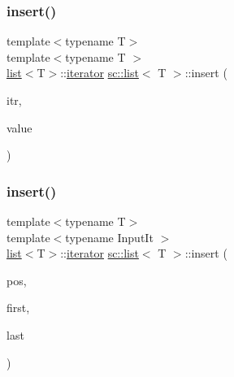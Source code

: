 \subsubsection{\texorpdfstring{insert()}{insert()}\hspace{0.1cm}{\footnotesize\ttfamily [4/7]}}
{\footnotesize\ttfamily template$<$typename T$>$ \\
template$<$typename T $>$ \\
\mbox{\hyperlink{classsc_1_1list}{list}}$<$T$>$\+::\mbox{\hyperlink{classsc_1_1list_1_1iterator}{iterator}} \mbox{\hyperlink{classsc_1_1list}{sc\+::list}}$<$ T $>$\+::insert (\begin{DoxyParamCaption}\item[{\mbox{\hyperlink{classsc_1_1list_1_1iterator}{iterator}}}]{itr,  }\item[{const T \&}]{value }\end{DoxyParamCaption})}

\mbox{\label{classsc_1_1list_ad26f50a102e4f66e4d0771bd602fa5f8}} 
\subsubsection{\texorpdfstring{insert()}{insert()}\hspace{0.1cm}{\footnotesize\ttfamily [5/7]}}
{\footnotesize\ttfamily template$<$typename T$>$ \\
template$<$typename Input\+It $>$ \\
\mbox{\hyperlink{classsc_1_1list}{list}}$<$T$>$\+::\mbox{\hyperlink{classsc_1_1list_1_1iterator}{iterator}} \mbox{\hyperlink{classsc_1_1list}{sc\+::list}}$<$ T $>$\+::insert (\begin{DoxyParamCaption}\item[{\mbox{\hyperlink{classsc_1_1list_1_1iterator}{iterator}}}]{pos,  }\item[{Input\+It}]{first,  }\item[{Input\+It}]{last }\end{DoxyParamCaption})}

\mbox{\label{classsc_1_1list_ad26f50a102e4f66e4d0771bd602fa5f8}} 
